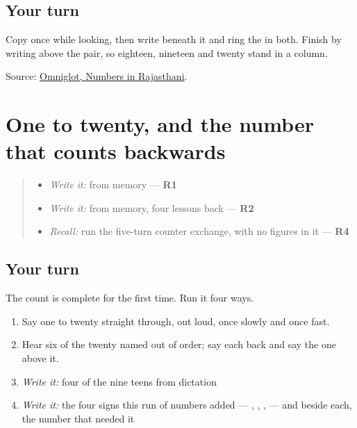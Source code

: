 \subsection*{Your turn}
Copy \textbf{} once while looking, then write \textbf{} beneath it and ring the \textbf{} in both. Finish by writing \textbf{} above the pair, so eighteen, nineteen and twenty stand in a column.

\begin{tcolorbox}[breakable,colback=teal!4,colframe=teal!35!black,title={Before you move on}]
Source: \href{https://www.omniglot.com/language/numbers/rajasthani.htm}{Omniglot, Numbers in Rajasthani}.
\end{tcolorbox}
\section[Practice]{One to twenty, and the number that counts backwards}

\label{lesson:MW-R38-count-twenty}



\begin{quote}
\begin{itemize}
\raggedright
  \item \emph{Write it:} \textbf{} from memory — \textbf{R1}
  \item \emph{Write it:} \textbf{} from memory, four lessons back — \textbf{R2}
  \item \emph{Recall:} run the five-turn counter exchange, with no figures in it — \textbf{R4}
\end{itemize}
\end{quote}

\subsection*{Your turn}
The count is complete for the first time. Run it four ways.

\begin{enumerate}
\raggedright
  \item Say one to twenty straight through, out loud, once slowly and once fast.
  \item Hear six of the twenty named out of order; say each back and say the one above it.
  \item \emph{Write it:} four of the nine teens from dictation
  \item \emph{Write it:} the four signs this run of numbers added — \textbf{}, \textbf{}, \textbf{}, \textbf{} — and beside each, the number that needed it
\end{enumerate}


